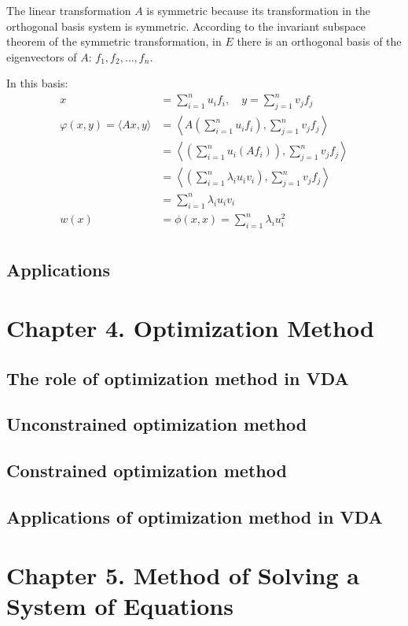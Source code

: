 The linear transformation $A$ is symmetric because its transformation in the orthogonal basis system is symmetric. According to the invariant subspace theorem of the symmetric transformation, in $E$ there is an orthogonal basis of the eigenvectors of $A$: $f_1, f_2, \ldots, f_n$.

In this basis:
\begin{align*}
    x &= \sum_{i=1}^n u_i f_i, \quad y = \sum_{j=1}^n v_j f_j\\
    \varphi(x, y) = \langle Ax, y \rangle 
    &= \left\langle A \left(\sum_{i=1}^n u_i f_i\right), \sum_{j=1}^n v_j f_j \right\rangle\\
    &= \left\langle \left(\sum_{i=1}^n u_i (Af_i)\right), \sum_{j=1}^n v_j f_j \right\rangle\\
    &= \left\langle \left(\sum_{i=1}^n \lambda_i u_i v_i\right), \sum_{j=1}^n v_j f_j \right\rangle\\
    &= \sum_{i=1}^n \lambda_i u_i v_i\\
    w(x) &= \phi(x, x) = \sum_{i=1}^n \lambda_i u_i^2\\
\end{align*}

\subsection{Applications}

\newpage
\section{Chapter 4. Optimization Method}
\subsection{The role of optimization method in VDA}
\subsection{Unconstrained optimization method}
\subsection{Constrained optimization method}
\subsection{Applications of optimization method in VDA}

\section{Chapter 5. Method of Solving a System of Equations}
